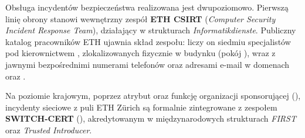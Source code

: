 
Obsługa incydentów bezpieczeństwa realizowana jest dwupoziomowo. Pierwszą linię obrony stanowi wewnętrzny zespół \textbf{ETH CSIRT} (\textit{Computer Security Incident Response Team}), działający w strukturach \textit{Informatikdienste}. Publiczny katalog pracowników ETH ujawnia skład zespołu: liczy on siedmiu specjalistów pod kierownictwem , zlokalizowanych fizycznie w budynku  (pokój ), wraz z jawnymi bezpośrednimi numerami telefonów oraz adresami e-mail w domenach  oraz .

Na poziomie krajowym, poprzez atrybut  oraz funkcję organizacji sponsorującej (), incydenty sieciowe z puli ETH Zürich są formalnie zintegrowane z zespołem \textbf{SWITCH-CERT} (), akredytowanym w międzynarodowych strukturach \textit{FIRST} oraz \textit{Trusted Introducer}.


